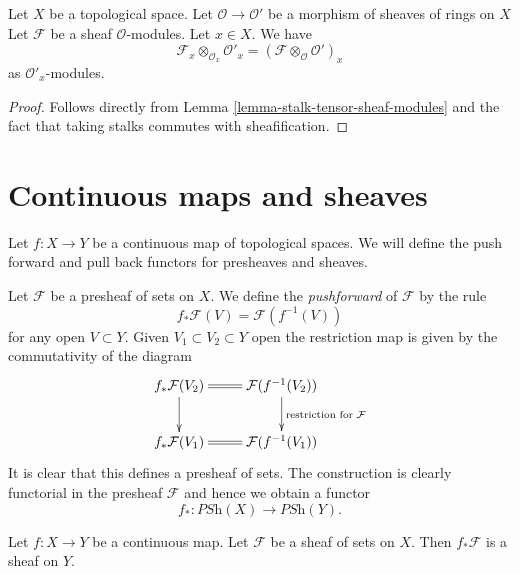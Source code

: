 \begin{lemma}
\label{lemma-stalk-tensor-sheaf-modules}
Let $X$ be a topological space.
Let $\mathcal{O} \to \mathcal{O}'$ be a morphism of
sheaves of rings on $X$
Let $\mathcal{F}$ be a sheaf $\mathcal{O}$-modules.
Let $x \in X$. We have
$$
\mathcal{F}_x \otimes_{\mathcal{O}_x} \mathcal{O}'_x
=
(\mathcal{F} \otimes_{\mathcal{O}} \mathcal{O}')_x
$$
as $\mathcal{O}'_x$-modules.
\end{lemma}

\begin{proof}
Follows directly from Lemma \ref{lemma-stalk-tensor-sheaf-modules}
and the fact that taking stalks commutes with sheafification.
\end{proof}


















\section{Continuous maps and sheaves}
\label{section-presheaves-functorial}

\noindent
Let $f : X \to Y$ be a continuous map of topological spaces.
We will define the push forward and pull back functors for
presheaves and sheaves.

\medskip\noindent
Let $\mathcal{F}$ be a presheaf of sets on $X$. We define the
{\it pushforward} of $\mathcal{F}$ by the rule
$$
f_*\mathcal{F}(V) = \mathcal{F}(f^{-1}(V))
$$
for any open $V \subset Y$.
Given $V_1 \subset V_2 \subset Y$ open the restriction map
is given by the commutativity of the diagram
$$
\xymatrix{
f_*\mathcal{F}(V_2) \ar[d] \ar@{=}[r] &
\mathcal{F}(f^{-1}(V_2)) \ar[d]^{\text{restriction for }\mathcal{F}} \\
f_*\mathcal{F}(V_1) \ar@{=}[r] &
\mathcal{F}(f^{-1}(V_1))
}
$$
It is clear that this defines a presheaf of sets. The construction
is clearly functorial in the presheaf $\mathcal{F}$ and hence
we obtain a functor
$$
f_* : \textit{PSh}(X) \longrightarrow \textit{PSh}(Y).
$$

\begin{lemma}
\label{lemma-pushforward-sheaf}
Let $f : X \to Y$ be a continuous map.
Let $\mathcal{F}$ be a sheaf of sets on $X$.
Then $f_*\mathcal{F}$ is a sheaf on $Y$.
\end{lemma}

